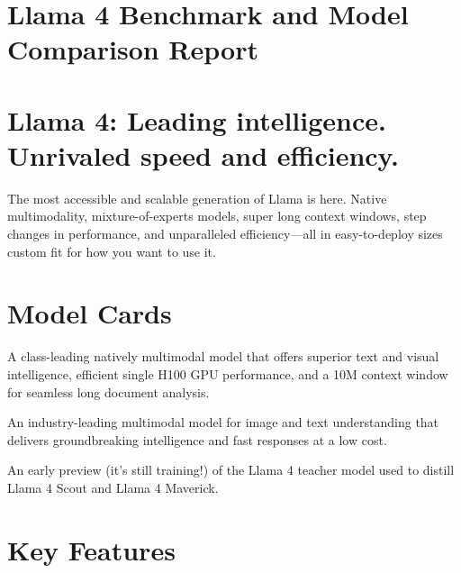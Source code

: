\documentclass{scrartcl}
\begin{document}

\section*{Llama 4 Benchmark and Model Comparison Report}

\bigskip

\section*{Llama 4: Leading intelligence. Unrivaled speed and efficiency.}

The most accessible and scalable generation of Llama is here. Native multimodality, mixture-of-experts models, super long context windows, step changes in performance, and unparalleled efficiency---all in easy-to-deploy sizes custom fit for how you want to use it.

\bigskip

\section*{Model Cards}

\begin{description}[font=\normalfont\bfseries\color{LlamaPrimary}]
    \item[Llama 4 Scout] A class-leading natively multimodal model that offers superior text and visual intelligence, efficient single H100 GPU performance, and a 10M context window for seamless long document analysis.
    \item[Llama 4 Maverick] An industry-leading multimodal model for image and text understanding that delivers groundbreaking intelligence and fast responses at a low cost.
    \item[Llama 4 Behemoth Preview] An early preview (it’s still training!) of the Llama 4 teacher model used to distill Llama 4 Scout and Llama 4 Maverick.
\end{description}

\bigskip

\section*{Key Features}
\end{document}
